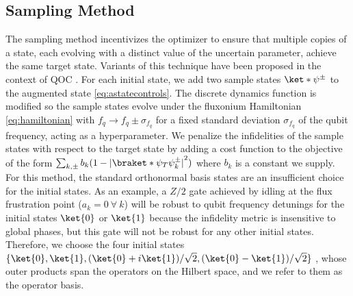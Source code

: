 \documentclass[
  amsfonts,
  amsmath,
  amssymb,
  pra,
  twocolumn,
  superscriptaddress,
]{revtex4-2}
\begin{document}
\subsection{Sampling Method}
The sampling method incentivizes the optimizer
to ensure that multiple copies of a state, each evolving
with a distinct value of the uncertain parameter, achieve
the same target state. Variants of this technique have been proposed
in the context of QOC
\cite{allen2019robust, khaneja2005optimal,
  reinhold2019controlling, rembold2020introduction}.
For each initial state,
we add two sample states $\ket*{\psi^{\pm}}$
to the augmented state \eqref{eq:astatecontrols}. The discrete dynamics
function is modified
so the sample states evolve under the fluxonium Hamiltonian \eqref{eq:hamiltonian}
with $f_{q} \rightarrow f_{q} \pm \sigma_{f_{q}}$ for a fixed
 standard deviation $\sigma_{f_{q}}$ of the qubit frequency, acting as a hyperparameter.
We penalize the infidelities of the sample states with respect to the target state
by adding a cost function to the objective of the form
$\sum_{k, \pm} b_{k} (1 - {\lvert \braket*{\psi_{T}}{\psi^{\pm}_{k}} \rvert}^{2})$
where $b_{k}$ is a constant we supply.
For this method, the standard orthonormal basis states are an insufficient choice
for the initial states. As an example, a $Z/2$ gate achieved by idling
at the flux frustration point ($a_{k} = 0 \ \forall \ k$)
will be robust to qubit frequency detunings for the initial states $\ket{0}$
or $\ket{1}$ because the infidelity metric is insensitive to global phases,
but this gate will not be robust for any other initial states.
Therefore, we choose the four initial states $\{\ket{0}, \ket{1}, (\ket{0} + i\ket{1}) / \sqrt{2},
(\ket{0} - \ket{1}) / \sqrt{2}\}$ \cite{chow2009randomized},
whose outer products span the operators on the Hilbert space,
and  we refer to them as the operator basis.
\end{document}
